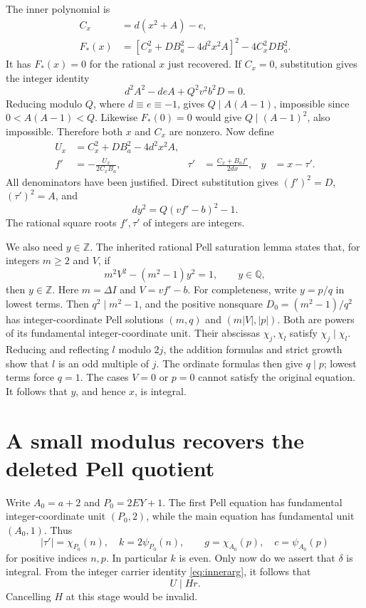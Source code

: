 \documentclass[11pt,a4paper]{article}
\newcommand{\Z}{\mathbb Z}
\newcommand{\Q}{\mathbb Q}
\theoremstyle{definition}
\theoremstyle{remark}
\numberwithin{equation}{section}
\begin{document}
The inner polynomial is
\begin{align*}
 C_x&=d(x^2+A)-e,\\
 F_*(x)&=\left[C_x^2+DB_{\!a}^2-4d^2x^2A\right]^2
                    -4C_x^2DB_{\!a}^2.
\end{align*}
It has $F_*(x)=0$ for the rational $x$ just recovered. If $C_x=0$,
substitution gives the integer identity
\[
 d^2A^2-deA+Q^2v^2b^2D=0.
\]
Reducing modulo $Q$, where $d\equiv e\equiv-1$, gives
$Q\mid A(A-1)$, impossible since $0<A(A-1)<Q$.
Likewise $F_*(0)=0$ would give $Q\mid(A-1)^2$, also impossible.
Therefore both $x$ and $C_x$ are nonzero. Now define
\begin{align*}
 U_x&=C_x^2+DB_{\!a}^2-4d^2x^2A,\\
 f'&=-\frac{U_x}{2C_xB_{\!a}},&
 \tau'&=\frac{C_x+B_{\!a}f'}{2dx},&y&=x-\tau'.
\end{align*}
All denominators have been justified. Direct substitution gives
$(f')^2=D$, $(\tau')^2=A$, and
\[
 dy^2=Q(vf'-b)^2-1.
\]
The rational square roots $f',\tau'$ of integers are integers.

We also need $y\in\Z$. The inherited rational Pell saturation lemma
states that, for integers $m\ge2$ and $V$, if
\[
 m^2V^2-(m^2-1)y^2=1,\qquad y\in\Q,
\]
then $y\in\Z$. Here $m=\Delta I$ and $V=vf'-b$.
For completeness, write $y=p/q$ in lowest terms. Then $q^2\mid m^2-1$,
and the positive nonsquare $D_0=(m^2-1)/q^2$ has integer-coordinate
Pell solutions $(m,q)$ and $(m|V|,|p|)$. Both are powers of its
fundamental integer-coordinate unit. Their abscissas $\chi_j,\chi_l$
satisfy $\chi_j\mid\chi_l$. Reducing and reflecting $l$ modulo $2j$,
the addition formulas and strict growth show that $l$ is an odd
multiple of $j$. The ordinate formulas then give $q\mid p$;
lowest terms force $q=1$. The cases $V=0$ or $p=0$ cannot satisfy
the original equation. It follows that $y$, and hence $x$, is integral.

\section{A small modulus recovers the deleted Pell quotient}
\label{sec:quotient}

Write $A_0=a+2$ and $P_0=2EY+1$. The first Pell equation has
fundamental integer-coordinate unit $(P_0,2)$, while the main equation
has fundamental unit $(A_0,1)$. Thus
\begin{equation}
 |\tau'|=\chi_{P_0}(n),\quad k=2\psi_{P_0}(n),\qquad
 g=\chi_{A_0}(p),\quad c=\psi_{A_0}(p)
 \label{eq:firstmainindices}
\end{equation}
for positive indices $n,p$. In particular $k$ is even. Only now do
we assert that $\delta$ is integral. From the integer carrier identity
\eqref{eq:innerarg}, it follows that
\begin{equation}
 U\mid Hr.\label{eq:weakdiv}
\end{equation}
Cancelling $H$ at this stage would be invalid.
\end{document}
